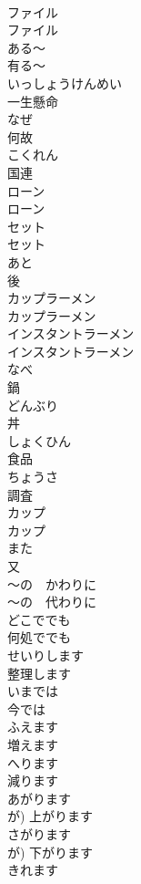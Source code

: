 \documentclass[8pt]{extreport}
\begin{document}
\begin{CJK}{UTF8}{min}
\\	ファイル	
\\	ファイル	
\\	ある〜	
\\	有る〜		
\\	いっしょうけんめい	
\\	一生懸命	
\\	なぜ	
\\	何故		
\\	こくれん	
\\	国連		
\\	ローン	
\\	ローン		
\\	セット	
\\	セット		
\\	あと	
\\	後		
\\	カップラーメン	
\\	カップラーメン		
\\	インスタントラーメン	
\\	インスタントラーメン		
\\	なべ	
\\	鍋		
\\	どんぶり	
\\	丼		
\\	しょくひん	
\\	食品		
\\	ちょうさ	
\\	調査		
\\	カップ	
\\	カップ		
\\	また	
\\	又		
\\	〜の　かわりに	
\\	〜の　代わりに		
\\	どこででも	
\\	何処ででも		
\\	せいりします	
\\	整理します	
\\	いまでは	
\\	今では		
\\	ふえます	
\\	増えます	
\\	へります	
\\	減ります		
\\	あがります	
\\	が)	上がります	
\\	さがります	
\\	が)	下がります		
\\	きれます	

\end{CJK}
\end{document}
